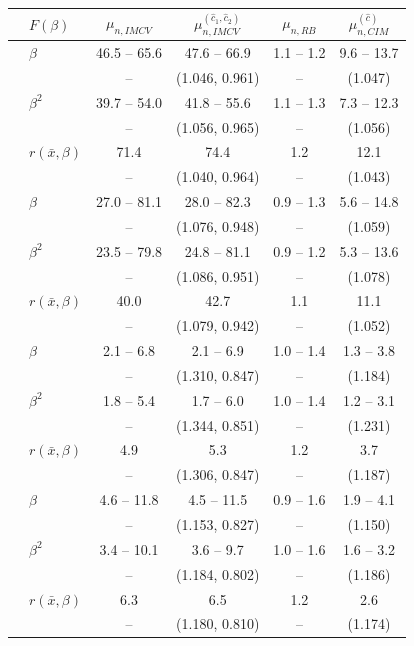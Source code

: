 \begin{tabular}{llcccc}
\toprule
 & $F(\beta)$ & $\mu_{n,IMCV}$ & $\mu^{(\hat c_1,\hat c_2)}_{n,IMCV}$ & $\mu_{n,RB}$ & $\mu^{(\hat c)}_{n,CIM}$ \\
\midrule
{} & $\beta$ & 46.5 -- 65.6 & 47.6 -- 66.9 & 1.1 -- 1.2 & 9.6 -- 13.7 \\
 & & -- & (1.046, 0.961) & -- & (1.047) \\
 & $\beta^2$ & 39.7 -- 54.0 & 41.8 -- 55.6 & 1.1 -- 1.3 & 7.3 -- 12.3 \\
 & & -- & (1.056, 0.965) & -- & (1.056) \\
 & $r(\bar{x},\beta)$ & 71.4 & 74.4 & 1.2 & 12.1 \\
 & & -- & (1.040, 0.964) & -- & (1.043) \\
\midrule
{} & $\beta$ & 27.0 -- 81.1 & 28.0 -- 82.3 & 0.9 -- 1.3 & 5.6 -- 14.8 \\
 & & -- & (1.076, 0.948) & -- & (1.059) \\
 & $\beta^2$ & 23.5 -- 79.8 & 24.8 -- 81.1 & 0.9 -- 1.2 & 5.3 -- 13.6 \\
 & & -- & (1.086, 0.951) & -- & (1.078) \\
 & $r(\bar{x},\beta)$ & 40.0 & 42.7 & 1.1 & 11.1 \\
 & & -- & (1.079, 0.942) & -- & (1.052) \\
\midrule
{} & $\beta$ & 2.1 -- 6.8 & 2.1 -- 6.9 & 1.0 -- 1.4 & 1.3 -- 3.8 \\
 & & -- & (1.310, 0.847) & -- & (1.184) \\
 & $\beta^2$ & 1.8 -- 5.4 & 1.7 -- 6.0 & 1.0 -- 1.4 & 1.2 -- 3.1 \\
 & & -- & (1.344, 0.851) & -- & (1.231) \\
 & $r(\bar{x},\beta)$ & 4.9 & 5.3 & 1.2 & 3.7 \\
 & & -- & (1.306, 0.847) & -- & (1.187) \\
\midrule
{} & $\beta$ & 4.6 -- 11.8 & 4.5 -- 11.5 & 0.9 -- 1.6 & 1.9 -- 4.1 \\
 & & -- & (1.153, 0.827) & -- & (1.150) \\
 & $\beta^2$ & 3.4 -- 10.1 & 3.6 -- 9.7 & 1.0 -- 1.6 & 1.6 -- 3.2 \\
 & & -- & (1.184, 0.802) & -- & (1.186) \\
 & $r(\bar{x},\beta)$ & 6.3 & 6.5 & 1.2 & 2.6 \\
 & & -- & (1.180, 0.810) & -- & (1.174) \\
\bottomrule
\end{tabular}

